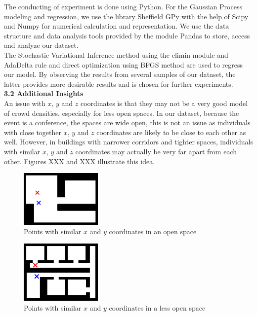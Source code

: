 \documentclass[letterpaper]{article}
\begin{document}
The conducting of experiment is done using Python. For the Gaussian Process modeling and regression, we use the library Sheffield GPy with the help of Scipy and Numpy for numerical calculation and representation. We use the data structure and data analysis tools provided by the module Pandas to store, access and analyze our dataset. \\

The Stochastic Variational Inference method using the climin module and AdaDelta rule and direct optimization using BFGS method are used to regress our model. By observing the results from several samples of our dataset, the latter provides more desirable results and is chosen for further experiments. \\

{\bf3.2  Additional Insights} \\

An issue with $x$, $y$ and $z$ coordinates is that they may not be a very good model of crowd densities, especially for less open spaces. 
In our dataset, because the event is a conference, the spaces are wide open, this is not an issue as individuals with close together $x$, $y$ and $z$ coordinates are likely to be close to each other as well. However, in buildings with narrower corridors and tighter spaces, individuals with similar $x$, $y$ and $z$ coordinates may actually be very far apart from each other. Figures XXX and XXX illustrate this idea.

\begin{figure}[h!]
  \centering
    \includegraphics[width=150px,natwidth=634,natheight=442]{openspace1.png}
  \caption{Points with similar $x$ and $y$ coordinates in an open space}
\end{figure}

\begin{figure}[h!]
  \centering
    \includegraphics[width=150px,natwidth=570,natheight=442]{openspace2.png}
  \caption{Points with similar $x$ and $y$ coordinates in a less open space}
\end{figure}
\end{document}
